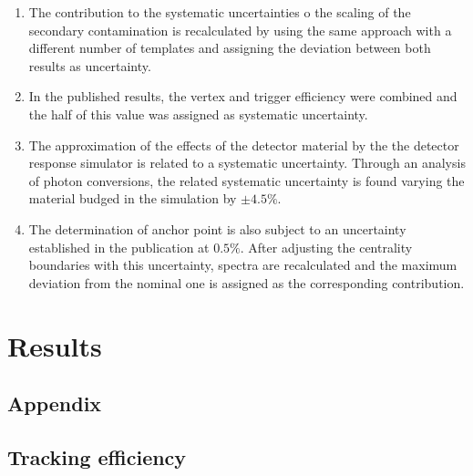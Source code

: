 \documentclass[12pt,a4paper]{report}
\begin{document}
\begin{enumerate}
\item The contribution to the systematic uncertainties o the scaling of the secondary contamination is recalculated by using the same approach with a different number of templates and assigning the deviation between both results as uncertainty.
\item In the published results, the vertex and trigger efficiency were combined and the half of this value was assigned as systematic uncertainty.
\item The approximation of the effects of the detector material by the the detector response simulator is related to a systematic uncertainty. Through an analysis of photon conversions, the related systematic uncertainty is found varying the material budged in the simulation by $\pm 4.5\%$.
\item The determination of anchor point is also subject to an uncertainty established in the publication at  $0.5\%$. After adjusting the centrality boundaries with this uncertainty, \pt spectra are recalculated and the maximum deviation from the nominal one is assigned as the corresponding contribution.

\end{enumerate} 

\chapter{Results}
\begin{appendices}
\chapter{Appendix}
\section{Tracking efficiency}
\label{TrkEffApp}
\end{appendices}



\end{document}

